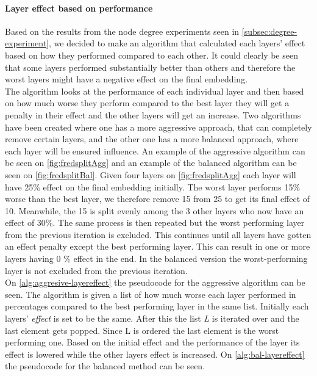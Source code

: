 \paragraph{Layer effect based on performance} \label{fredsplit}
Based on the results from the node degree experiments seen in \autoref{subsec:degree-experiment}, we decided to make an algorithm that calculated each layers' effect based on how they performed compared to each other.
It could clearly be seen that some layers performed substantially better than others and therefore the worst layers might have a negative effect on the final embedding.
\\
The algorithm looks at the performance of each individual layer and then based on how much worse they perform compared to the best layer they will get a penalty in their effect and the other layers will get an increase.
Two algorithms have been created where one has a more aggressive approach, that can completely remove certain layers, and the other one has a more balanced approach, where each layer will be ensured influence.
An example of the aggressive algorithm can be seen on \autoref{fig:fredsplitAgg} and an example of the balanced algorithm can be seen on \autoref{fig:fredsplitBal}.
Given four layers on \autoref{fig:fredsplitAgg} each layer will have 25\% effect on the final embedding initially.
The worst layer performs 15\% worse than the best layer, we therefore remove 15 from 25 to get its final effect of 10.
Meanwhile, the 15 is split evenly among the 3 other layers who now have an effect of 30\%.
The same process is then repeated but the worst performing layer from the previous iteration is excluded.
This continues until all layers have gotten an effect penalty except the best performing layer.
This can result in one or more layers having 0 \% effect in the end.
In the balanced version the worst-performing layer is not excluded from the previous iteration.
\\
On \autoref{alg:aggresive-layereffect} the pseudocode for the aggressive algorithm can be seen.
The algorithm is given a list of how much worse each layer performed in percentages compared to the best performing layer in the same list.
Initially each layers' \textit{effect} is set to be the same.
After this the list \textit{L} is iterated over and the last element gets popped.
Since L is ordered the last element is the worst performing one.
Based on the initial effect and the performance of the layer its effect is lowered while the other layers effect is increased.
On \autoref{alg:bal-layereffect} the pseudocode for the balanced method can be seen.
